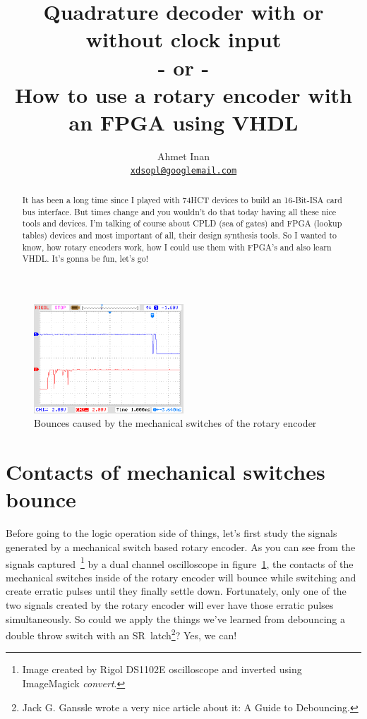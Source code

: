 \documentclass[a4paper]{article}
\title{Quadrature decoder with or without clock input\\- or -\\How to use a rotary encoder with an FPGA using VHDL}
\author{Ahmet Inan\\\href{mailto:xdsopl@googlemail.com}{\nolinkurl{xdsopl@googlemail.com}}}
\begin{document}
\maketitle
\begin{abstract}
It has been a long time since I played with 74HCT devices to build an 16-Bit-ISA card bus interface.
But times change and you wouldn't do that today having all these nice tools and devices.
I'm talking of course about CPLD (sea of gates) and FPGA (lookup tables) devices and most important of all, their design synthesis tools.
So I wanted to know, how rotary encoders work, how I could use them with FPGA's and also learn VHDL.
It's gonna be fun, let's go!
\end{abstract}
\begin{figure}
\centering
\includegraphics[width=0.5\textwidth]{quadrature_decoder_rigol.png}
\caption{Bounces caused by the mechanical switches of the rotary encoder}
\label{fig:bounces}
\end{figure}
\section{Contacts of mechanical switches bounce}
Before going to the logic operation side of things, let's first study the signals generated by a mechanical switch based rotary encoder.
As you can see from the signals captured~\footnote{Image created by Rigol DS1102E oscilloscope and inverted using ImageMagick \emph{convert}.}
by a dual channel oscilloscope in figure~\ref{fig:bounces},
the contacts of the mechanical switches inside of the rotary encoder will bounce while switching and create erratic pulses until they finally settle down.
Fortunately, only one of the two signals created by the rotary encoder will ever have those erratic pulses simultaneously.
So could we apply the things we've learned from debouncing a double throw switch with an SR~latch\footnote{Jack G. Ganssle wrote a very nice article about it: A Guide to Debouncing.}?
Yes, we can!
\newpage
\end{document}
